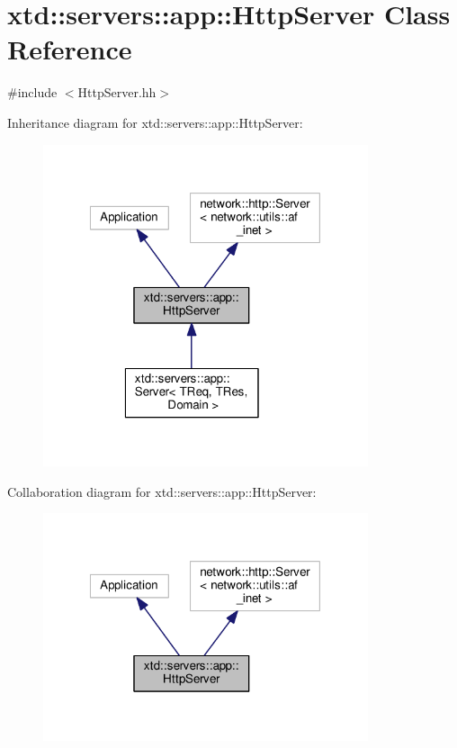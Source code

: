 \hypertarget{classxtd_1_1servers_1_1app_1_1HttpServer}{\section{xtd\-:\-:servers\-:\-:app\-:\-:Http\-Server Class Reference}
\label{classxtd_1_1servers_1_1app_1_1HttpServer}
}


{\ttfamily \#include $<$Http\-Server.\-hh$>$}



Inheritance diagram for xtd\-:\-:servers\-:\-:app\-:\-:Http\-Server\-:
\nopagebreak
\begin{figure}[H]
\begin{center}
\leavevmode
\includegraphics[width=271pt]{classxtd_1_1servers_1_1app_1_1HttpServer__inherit__graph}
\end{center}
\end{figure}


Collaboration diagram for xtd\-:\-:servers\-:\-:app\-:\-:Http\-Server\-:
\nopagebreak
\begin{figure}[H]
\begin{center}
\leavevmode
\includegraphics[width=271pt]{classxtd_1_1servers_1_1app_1_1HttpServer__coll__graph}
\end{center}
\end{figure}
